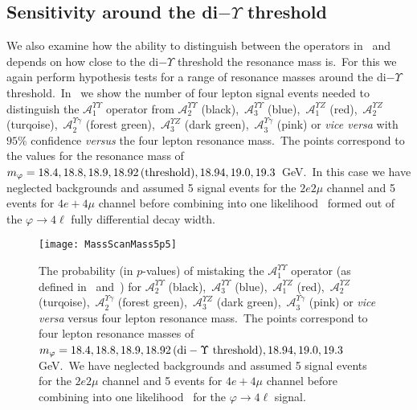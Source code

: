 \documentclass[nofootinbib,twocolumn,prl,preprintnumbers]{revtex4-1}
\begin{document}
\subsection{Sensitivity around the di$-\Upsilon$ threshold} \label{sec:thresh}

We also examine how the ability to distinguish between the operators in~ and~ depends on how close to the di$-\Upsilon$ threshold the resonance mass is.~For this we again perform hypothesis tests for a range of resonance masses around the di$-\Upsilon$ threshold.~In~ we show the number of four lepton signal events needed to distinguish the $\mathcal{A}_{1}^{\Upsilon\Upsilon}$ operator from $\mathcal{A}_{2}^{\Upsilon\Upsilon}$ (black),~$\mathcal{A}_{3}^{\Upsilon\Upsilon}$ (blue),~$\mathcal{A}_{1}^{\Upsilon Z}$ (red),~$\mathcal{A}_{2}^{\Upsilon Z}$ (turqoise),~$\mathcal{A}_{2}^{\Upsilon \gamma}$ (forest green),~$\mathcal{A}_{3}^{\Upsilon Z}$ (dark green),~$\mathcal{A}_{3}^{\Upsilon \gamma}$ (pink) or \emph{vice versa} with $95\%$ confidence \emph{versus} the four lepton resonance mass.~The points correspond to the values for the resonance mass of $m_\varphi = 18.4, 18.8, 18.9, 18.92\,(\rm{threshold}), 18.94, 19.0, 19.3$~GeV.~In this case we have neglected backgrounds and assumed 5 signal events for the $2e2\mu$ channel and 5 events for $4e + 4\mu$ channel before combining into one likelihood~\cite{Chen:2015rha,Chen:2016ofc} formed out of the $\varphi \to 4\ell$ fully differential decay width.
\begin{figure}[tbh]
\begin{center}
\texttt{[image: MassScanMass5p5]}
\caption{The probability (in $p$-values) of mistaking the $\mathcal{A}_{1}^{\Upsilon\Upsilon}$ operator (as defined in~ and~) for $\mathcal{A}_{2}^{\Upsilon\Upsilon}$ (black),~$\mathcal{A}_{3}^{\Upsilon\Upsilon}$ (blue),~$\mathcal{A}_{1}^{\Upsilon Z}$ (red),~$\mathcal{A}_{2}^{\Upsilon Z}$ (turqoise),~$\mathcal{A}_{2}^{\Upsilon \gamma}$ (forest green),~$\mathcal{A}_{3}^{\Upsilon Z}$ (dark green),~$\mathcal{A}_{3}^{\Upsilon \gamma}$ (pink) or \emph{vice versa} versus four lepton resonance mass.~The points correspond to four lepton resonance masses of $m_\varphi = 18.4, 18.8, 18.9, 18.92\,(\rm{di}-\Upsilon~\rm{threshold}), 18.94, 19.0, 19.3$\,GeV.~We have neglected backgrounds and assumed 5 signal events for the $2e2\mu$ channel and 5 events for $4e + 4\mu$ channel before combining into one likelihood~\cite{Chen:2015rha,Chen:2016ofc} for the $\varphi \to 4\ell$ signal.}
\label{fig:hyptest2}
\end{center}
\end{figure}
\end{document}
